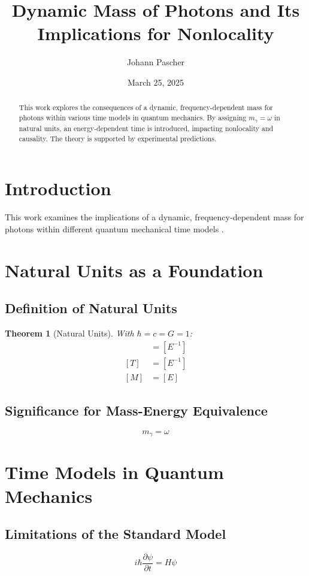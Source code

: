 \documentclass[12pt,a4paper]{article}
\title{Dynamic Mass of Photons and Its Implications for Nonlocality}
\author{Johann Pascher}
\date{March 25, 2025}
\newtheorem{theorem}{Theorem}[section]
\begin{document}
	
	\maketitle
	
	\begin{abstract}
		This work explores the consequences of a dynamic, frequency-dependent mass for photons within various time models in quantum mechanics. By assigning \(m_\gamma = \omega\) in natural units, an energy-dependent time is introduced, impacting nonlocality and causality. The theory is supported by experimental predictions.
	\end{abstract}
	
	\tableofcontents
	\newpage
	
	\section{Introduction}
	This work examines the implications of a dynamic, frequency-dependent mass for photons within different quantum mechanical time models \cite{pascher1}.
	
	\section{Natural Units as a Foundation}
	\subsection{Definition of Natural Units}
	\begin{theorem}[Natural Units]
		With \(\hbar = c = G = 1\):
		\begin{align}
			[L] &= [E^{-1}] \\
			[T] &= [E^{-1}] \\
			[M] &= [E]
		\end{align}
	\end{theorem}
	
	\subsection{Significance for Mass-Energy Equivalence}
	\begin{equation}
		m_\gamma = \omega
	\end{equation}
	
	\section{Time Models in Quantum Mechanics}
	\subsection{Limitations of the Standard Model}
	\begin{equation}
		i\hbar\frac{\partial\psi}{\partial t} = H\psi
	\end{equation}
	
\end{document}
